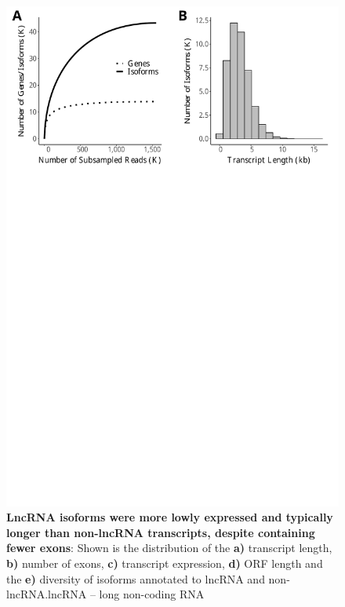 \begin{figure}[htp]
	\begin{center}
		\includegraphics[page=10,scale = 0.55]{Figures/IsoSeqWholeTranscriptome.pdf}
	\end{center}
	\captionsetup{width=0.95\textwidth}
	\caption[Characterisation of LncRNA in Whole Transcriptome runs]%
	{\textbf{LncRNA isoforms were more lowly expressed and typically longer than non-lncRNA transcripts, despite containing fewer exons}: Shown is the distribution of the \textbf{a)} transcript length, \textbf{b)} number of exons, \textbf{c)} transcript expression, \textbf{d)} ORF length and the \textbf{e)} diversity of isoforms annotated to lncRNA and non-lncRNA.lncRNA – long non-coding RNA}
	\label{fig:isoseq_whole_lncRNA}
\end{figure}


